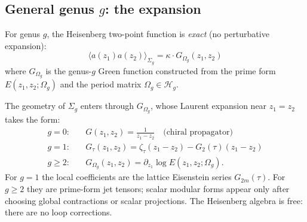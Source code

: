 \subsection{\texorpdfstring{General genus $g$: the expansion}{General genus g: the expansion}}
\label{subsec:heisenberg-general-genus}

\begin{theorem}\label{thm:heisenberg-all-genus}
For genus $g$, the Heisenberg two-point function is \emph{exact} (no perturbative expansion):
\begin{equation}
\langle a(z_1) a(z_2) \rangle_{\Sigma_g} = \kappa \cdot G_{\Omega_g}(z_1, z_2)
\end{equation}
where $G_{\Omega_g}$ is the genus-$g$ Green function constructed from the prime form $E(z_1, z_2; \Omega_g)$ and the period matrix $\Omega_g \in \mathcal{H}_g$.

The geometry of $\Sigma_g$ enters through $G_{\Omega_g}$, whose Laurent expansion near $z_1 = z_2$ takes the form:
\begin{align}
g=0: \quad & G(z_1, z_2) = \frac{1}{z_1 - z_2} \quad \text{(chiral propagator)} \\
g=1: \quad & G_\tau(z_1, z_2) = \zeta_\tau(z_1-z_2) - G_2(\tau)(z_1-z_2) \\
g \geq 2: \quad & G_{\Omega_g}(z_1, z_2) = \partial_{z_1}\log E(z_1,z_2;\Omega_g).
\end{align}
For $g=1$ the local coefficients are the lattice Eisenstein series
$G_{2m}(\tau)$. For $g\ge2$ they are prime-form jet tensors; scalar
modular forms appear only after choosing global contractions or scalar
projections. The Heisenberg algebra is free: there are no loop
corrections.
\end{theorem}

